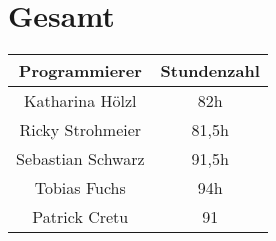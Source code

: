 \section{Gesamt}
\begin{center}
	\begin{tabular}{|c|c|}
		\hline \textbf{Programmierer} & \textbf{Stundenzahl} \\ 
		\hline Katharina Hölzl  &  82h\\ 
		\hline Ricky Strohmeier & 81,5h \\ 
		\hline Sebastian Schwarz & 91,5h \\ 
		\hline Tobias Fuchs &  94h\\ 
		\hline Patrick Cretu &  91\\ 
		\hline 
	\end{tabular}
\end{center} 